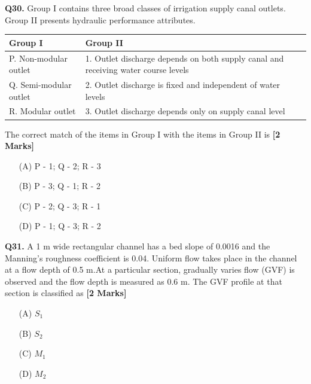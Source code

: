 \documentclass[11pt]{article}
\newcommand{\questionb}[2]{
    \noindent\textbf{Q#2.} #1 \hfill \textbf{[2 Marks]}
}
\begin{document}
\questionb{Group I contains three broad classes of irrigation supply canal outlets. Group II presents hydraulic performance attributes.
\begin{center}
\begin{tabular}{|l|l|}
\hline
Group I & Group II \\
\hline
P. Non-modular outlet & 1. Outlet discharge depends on both supply canal and receiving water course levels \\
Q. Semi-modular outlet & 2. Outlet discharge is fixed and independent of water levels \\
R. Modular outlet & 3. Outlet discharge depends only on supply canal level \\
\hline
\end{tabular}
\end{center}
The correct match of the items in Group I with the items in Group II is}{30}
\begin{enumerate}
    \item[(A)] P - 1; Q - 2; R - 3
    \item[(B)] P - 3; Q - 1; R - 2
    \item[(C)] P - 2; Q - 3; R - 1
    \item[(D)] P - 1; Q - 3; R - 2
\end{enumerate}

\vspace{0.5cm}

\questionb{A 1 m wide rectangular channel has a bed slope of 0.0016 and the Manning's roughness coefficient is 0.04. Uniform flow takes place in the channel at a flow depth of 0.5 m.At a particular section, gradually varies flow (GVF) is observed and the flow depth is measured as 0.6 m. The GVF profile at that section is classified as}{31}
\begin{enumerate}
    \item [(A)] $S_1$
    \item[(B)]$S_2$
    \item[(C)] $M_1$
    \item[(D)] $M_2$ 
\end{enumerate}

\vspace{0.5cm}
\end{document}
